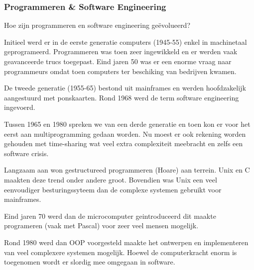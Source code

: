 \documentclass[../main.tex]{subfiles}
\begin{document}
\subsubsection{Programmeren \& Software Engineering}
\begin{question}
Hoe zijn programmeren en software engineering ge\"evolueerd?
\end{question}
\begin{solution}
Initieel werd er in de eerste generatie computers (1945-55) enkel in machinetaal geprogrameerd.
Programmeren was toen zeer ingewikkeld en er werden vaak geavanceerde trucs toegepast.
Eind jaren 50 was er een enorme vraag naar programmeurs omdat toen computers ter beschiking van bedrijven kwamen.

De tweede generatie (1955-65) bestond uit mainframes en werden hoofdzakelijk aangestuurd met ponskaarten.
Rond 1968 werd de term software engineering ingevoerd.

Tussen 1965 en 1980 spreken we van een derde generatie en toen kon er voor het eerst aan multiprogramming gedaan worden.
Nu moest er ook rekening worden gehouden met time-sharing wat veel extra complexiteit meebracht en zelfs een software crisis.

Langzaam aan won gestructureed programmeren (Hoare) aan terrein.
Unix en C maakten deze trend onder andere groot.
Bovendien was Unix een veel eenvoudiger besturingssyteem dan de complexe systemen gebruikt voor mainframes.

Eind jaren 70 werd dan de microcomputer geintroduceerd dit maakte programeren (vaak met Pascal) voor zeer veel mensen mogelijk.

Rond 1980 werd dan OOP voorgesteld maakte het ontwerpen en implementeren van veel complexere systemen mogelijk.
Hoewel de computerkracht enorm is toegenomen wordt er slordig mee omgegaan in software.
\end{solution}
\end{document}
